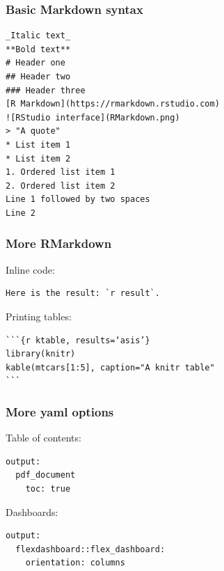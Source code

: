 \documentclass{beamer}
\begin{document}
	\begin{frame}[fragile]
		\frametitle{Basic Markdown syntax}

		\begin{exampleblock}{}
		\begin{BVerbatim}
_Italic text_
**Bold text**
# Header one
## Header two
### Header three
[R Markdown](https://rmarkdown.rstudio.com)
![RStudio interface](RMarkdown.png)
> "A quote"
* List item 1
* List item 2
1. Ordered list item 1
2. Ordered list item 2
Line 1 followed by two spaces  
Line 2 
		\end{BVerbatim}
		\end{exampleblock}{}

	\end{frame}

	\begin{frame}[fragile]
		\frametitle{More RMarkdown}

		Inline code:
		\begin{exampleblock}{}
		\begin{BVerbatim}
Here is the result: `r result`.
		\end{BVerbatim}
		\end{exampleblock}{}

		\vspace{1em}

		Printing tables:
		\begin{exampleblock}{}
		\begin{BVerbatim}
```{r ktable, results=‘asis’}
library(knitr)
kable(mtcars[1:5], caption="A knitr table"
```
		\end{BVerbatim}
		\end{exampleblock}{}

	\end{frame}

	\begin{frame}[fragile]
		\frametitle{More yaml options}

		Table of contents:
		\begin{exampleblock}{}
		\begin{BVerbatim}
output:
  pdf_document
    toc: true
		\end{BVerbatim}
		\end{exampleblock}{}

		\vspace{1em}

		Dashboards:
		\begin{exampleblock}{}
		\begin{BVerbatim}
output:
  flexdashboard::flex_dashboard:
    orientation: columns
		\end{BVerbatim}
		\end{exampleblock}{}

	\end{frame}
	
\end{document}
